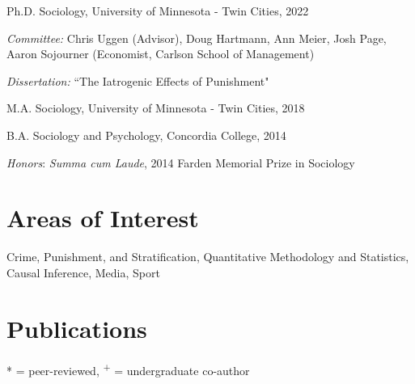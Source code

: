 \documentclass[letterpaper]{article}
\renewenvironment{itemize}{
  \begin{list}{}{
    \setlength{\leftmargin}{1.5em}
  }
}{
  \end{list}
}
\begin{document}
\begin{itemize}
  \item Ph.D. Sociology, University of Minnesota - Twin Cities, 2022
   \begin{itemize}
	\item \textit{Committee:} Chris Uggen (Advisor),  Doug Hartmann, Ann Meier, Josh Page, Aaron Sojourner (Economist, Carlson School of Management)
           \item \textit{Dissertation:} ``The Iatrogenic Effects of Punishment"
\end{itemize}
    
\item M.A. Sociology, University of Minnesota - Twin Cities, 2018

 \item B.A. Sociology and Psychology, Concordia College, 2014
 \begin{itemize}
     \item \textit{Honors}: \textit{Summa cum Laude}, 2014 Farden Memorial Prize in Sociology
    \end{itemize}
\end{itemize}

\section*{\textbf{Areas of Interest}}

Crime, Punishment, and Stratification, Quantitative Methodology and Statistics, Causal Inference, Media, Sport


\section*{\textbf{Publications}} * = peer-reviewed, \textsuperscript{+} = undergraduate co-author
\end{document}
